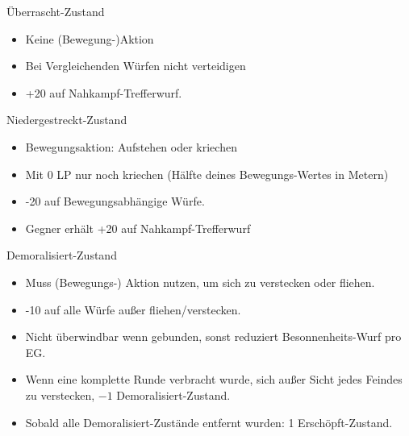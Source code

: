 \documentclass{article}
\begin{document}
\begin{multicols*}{3}
    \begin{slsframe}{Überrascht-Zustand}
        \begin{itemize}
            \setlength\itemsep{-0.2em}
            \item Keine (Bewegung-)Aktion 
            \item Bei Vergleichenden Würfen nicht verteidigen
            \item +20 auf Nahkampf-Trefferwurf.
        \end{itemize}   
    \end{slsframe}     

    \begin{slsframe}{Niedergestreckt-Zustand}
        \begin{itemize}
            \setlength\itemsep{-0.2em}
            \item Bewegungsaktion: Aufstehen oder kriechen 
            \item Mit 0 LP nur noch kriechen (Hälfte deines Bewegungs-Wertes in Metern)
            \item -20 auf Bewegungsabhängige Würfe.
            \item Gegner erhält +20 auf Nahkampf-Trefferwurf
        \end{itemize}   
    \end{slsframe} 
        

    \begin{slsframe}{Demoralisiert-Zustand}
        \begin{itemize}
            \setlength\itemsep{-0.2em}
            \item Muss (Bewegungs-) Aktion nutzen, um sich zu verstecken oder fliehen.
            \item -10 auf alle Würfe außer fliehen/verstecken.
            \item Nicht überwindbar wenn gebunden, sonst reduziert Besonnenheits-Wurf pro EG.
            \item Wenn eine komplette Runde verbracht wurde, sich außer Sicht jedes Feindes zu verstecken, $-1$ Demoralisiert-Zustand.
            \item Sobald alle Demoralisiert-Zustände entfernt wurden: 1 Erschöpft-Zustand.
        \end{itemize}   
    \end{slsframe}
        

\end{multicols*}
\end{document}

